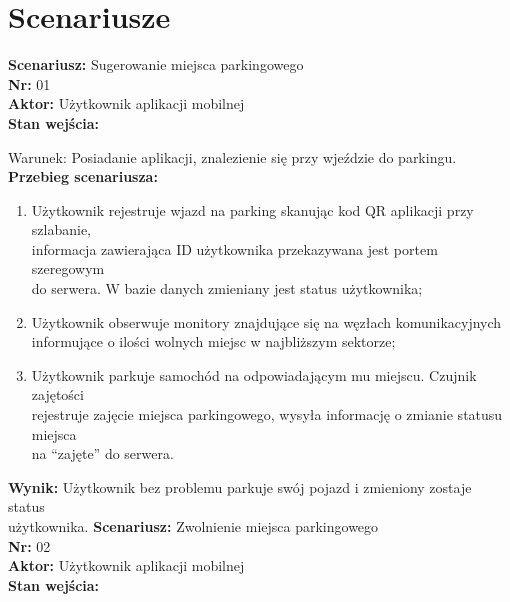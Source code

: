 \documentclass[12pt,a4paper]{article}
\begin{document}
\section{Scenariusze}
{\large \bf Scenariusz:} Sugerowanie miejsca parkingowego
\\{\bf Nr:} 01
\\{\bf Aktor:} Użytkownik aplikacji mobilnej
\\{\bf Stan wejścia:}

Warunek: Posiadanie aplikacji, znalezienie się przy wjeździe do parkingu.
\\{\bf Przebieg scenariusza:}
\begin{enumerate}
\item Użytkownik rejestruje wjazd na parking skanując kod QR aplikacji przy szlabanie,\\informacja zawierająca ID użytkownika przekazywana jest portem szeregowym\\do serwera. W bazie danych zmieniany jest status użytkownika;
\item Użytkownik obserwuje monitory znajdujące się na węzłach komunikacyjnych\\informujące o ilości wolnych miejsc w najbliższym sektorze;
\item Użytkownik parkuje samochód  na odpowiadającym mu miejscu. Czujnik zajętości\\rejestruje zajęcie miejsca parkingowego, wysyła informację o zmianie statusu miejsca\\na “zajęte” do serwera.
\end{enumerate}
{\bf Wynik:} Użytkownik bez problemu parkuje swój pojazd i zmieniony zostaje status\\użytkownika.
\newline\newline\newline\newline
{\large \bf Scenariusz:} Zwolnienie miejsca parkingowego
\\{\bf Nr:} 02
\\{\bf Aktor:} Użytkownik aplikacji mobilnej
\\{\bf Stan wejścia:}
\end{document}
